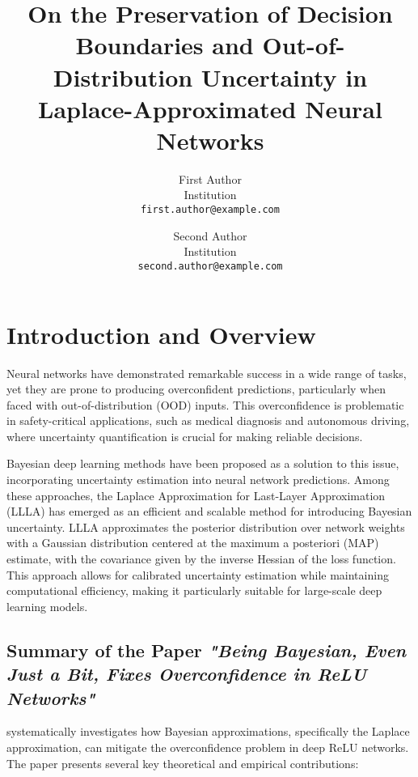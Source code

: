 \documentclass{article}
\title{On the Preservation of Decision Boundaries and Out-of-Distribution Uncertainty in Laplace-Approximated Neural Networks}
\author{%
  First Author \\
  Institution \\
  \texttt{first.author@example.com}
  \and
  Second Author \\
  Institution \\
  \texttt{second.author@example.com}
}
\begin{document}
\maketitle

\section{Introduction and Overview}

Neural networks have demonstrated remarkable success in a wide range of tasks, yet they are prone to producing overconfident predictions, particularly when faced with out-of-distribution (OOD) inputs. This overconfidence is problematic in safety-critical applications, such as medical diagnosis and autonomous driving, where uncertainty quantification is crucial for making reliable decisions.

Bayesian deep learning methods have been proposed as a solution to this issue, incorporating uncertainty estimation into neural network predictions. Among these approaches, the Laplace Approximation for Last-Layer Approximation (LLLA)\cite{main_paper} has emerged as an efficient and scalable method for introducing Bayesian uncertainty. LLLA approximates the posterior distribution over network weights with a Gaussian distribution centered at the maximum a posteriori (MAP) estimate, with the covariance given by the inverse Hessian of the loss function. This approach allows for calibrated uncertainty estimation while maintaining computational efficiency, making it particularly suitable for large-scale deep learning models.

\subsection{Summary of the Paper \emph{"Being Bayesian, Even Just a Bit, Fixes Overconfidence in ReLU Networks"}}

\cite{main_paper} systematically investigates how Bayesian approximations, specifically the Laplace approximation, can mitigate the overconfidence problem in deep ReLU networks. The paper presents several key theoretical and empirical contributions:
\end{document}
